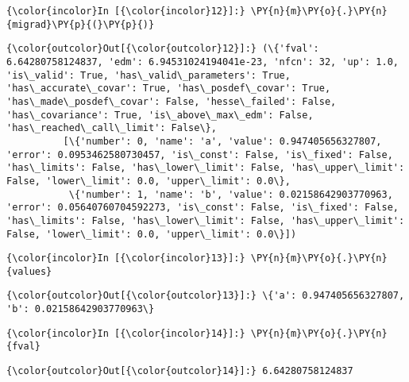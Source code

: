     \begin{Verbatim}[commandchars=\\\{\}]
{\color{incolor}In [{\color{incolor}12}]:} \PY{n}{m}\PY{o}{.}\PY{n}{migrad}\PY{p}{(}\PY{p}{)}
\end{Verbatim}


    
    
    
    
    
    
    
    
\begin{Verbatim}[commandchars=\\\{\}]
{\color{outcolor}Out[{\color{outcolor}12}]:} (\{'fval': 6.64280758124837, 'edm': 6.94531024194041e-23, 'nfcn': 32, 'up': 1.0, 'is\_valid': True, 'has\_valid\_parameters': True, 'has\_accurate\_covar': True, 'has\_posdef\_covar': True, 'has\_made\_posdef\_covar': False, 'hesse\_failed': False, 'has\_covariance': True, 'is\_above\_max\_edm': False, 'has\_reached\_call\_limit': False\},
          [\{'number': 0, 'name': 'a', 'value': 0.947405656327807, 'error': 0.0953462580730457, 'is\_const': False, 'is\_fixed': False, 'has\_limits': False, 'has\_lower\_limit': False, 'has\_upper\_limit': False, 'lower\_limit': 0.0, 'upper\_limit': 0.0\},
           \{'number': 1, 'name': 'b', 'value': 0.02158642903770963, 'error': 0.05640760704592273, 'is\_const': False, 'is\_fixed': False, 'has\_limits': False, 'has\_lower\_limit': False, 'has\_upper\_limit': False, 'lower\_limit': 0.0, 'upper\_limit': 0.0\}])
\end{Verbatim}
            
    \begin{Verbatim}[commandchars=\\\{\}]
{\color{incolor}In [{\color{incolor}13}]:} \PY{n}{m}\PY{o}{.}\PY{n}{values}
\end{Verbatim}


\begin{Verbatim}[commandchars=\\\{\}]
{\color{outcolor}Out[{\color{outcolor}13}]:} \{'a': 0.947405656327807, 'b': 0.02158642903770963\}
\end{Verbatim}
            
    \begin{Verbatim}[commandchars=\\\{\}]
{\color{incolor}In [{\color{incolor}14}]:} \PY{n}{m}\PY{o}{.}\PY{n}{fval}
\end{Verbatim}


\begin{Verbatim}[commandchars=\\\{\}]
{\color{outcolor}Out[{\color{outcolor}14}]:} 6.64280758124837
\end{Verbatim}
            
